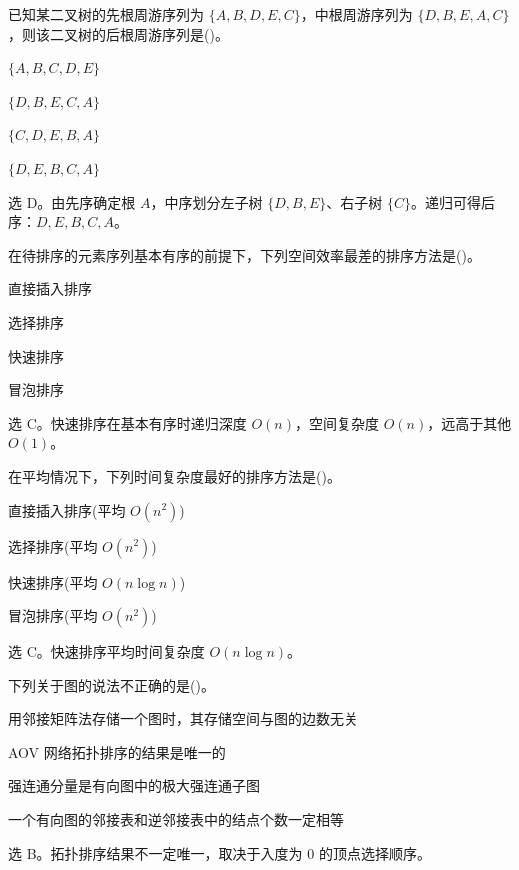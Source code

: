 \begin{question}
已知某二叉树的先根周游序列为 $\{A,B,D,E,C\}$，中根周游序列为 $\{D,B,E,A,C\}$，则该二叉树的后根周游序列是(\quad)。
\begin{choiceoptions}[2]
  \item $\{A,B,C,D,E\}$
  \item $\{D,B,E,C,A\}$
  \item $\{C,D,E,B,A\}$
  \item $\{D,E,B,C,A\}$
\end{choiceoptions}
\begin{solution}
选 D。由先序确定根 $A$，中序划分左子树 $\{D,B,E\}$、右子树 $\{C\}$。递归可得后序：$D,E,B,C,A$。
\end{solution}
\end{question}

\begin{question}
在待排序的元素序列基本有序的前提下，下列空间效率最差的排序方法是(\quad)。
\begin{choiceoptions}[2]
  \item 直接插入排序
  \item 选择排序
  \item 快速排序
  \item 冒泡排序
\end{choiceoptions}
\begin{solution}
选 C。快速排序在基本有序时递归深度 $O(n)$，空间复杂度 $O(n)$，远高于其他 $O(1)$。
\end{solution}
\end{question}

\begin{question}
在平均情况下，下列时间复杂度最好的排序方法是(\quad)。
\begin{choiceoptions}[2]
  \item 直接插入排序(平均 $O(n^2)$)
  \item 选择排序(平均 $O(n^2)$)
  \item 快速排序(平均 $O(n\log n)$)
  \item 冒泡排序(平均 $O(n^2)$)
\end{choiceoptions}
\begin{solution}
选 C。快速排序平均时间复杂度 $O(n\log n)$。
\end{solution}
\end{question}

\begin{question}
下列关于图的说法不正确的是(\quad)。
\begin{choiceoptions}[2]
  \item 用邻接矩阵法存储一个图时，其存储空间与图的边数无关
  \item AOV 网络拓扑排序的结果是唯一的
  \item 强连通分量是有向图中的极大强连通子图
  \item 一个有向图的邻接表和逆邻接表中的结点个数一定相等
\end{choiceoptions}
\begin{solution}
选 B。拓扑排序结果不一定唯一，取决于入度为 $0$ 的顶点选择顺序。
\end{solution}
\end{question}


